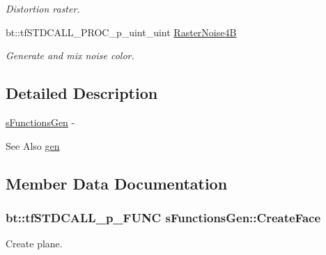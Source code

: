 \begin{DoxyCompactItemize}
\begin{DoxyCompactList}\small\item\em Distortion raster. \end{DoxyCompactList}\item 
\hypertarget{structs_functions_gen_a7611873c6067c5f5ad52719f551ecf9d}{bt\-::tf\-S\-T\-D\-C\-A\-L\-L\-\_\-\-P\-R\-O\-C\-\_\-p\-\_\-uint\-\_\-uint \hyperlink{structs_functions_gen_a7611873c6067c5f5ad52719f551ecf9d}{Raster\-Noise4\-B}}\label{structs_functions_gen_a7611873c6067c5f5ad52719f551ecf9d}

\begin{DoxyCompactList}\small\item\em Generate and mix noise color. \end{DoxyCompactList}\end{DoxyCompactItemize}


\subsection{Detailed Description}
\hyperlink{structs_functions_gen}{s\-Functions\-Gen} -\/ 

\begin{DoxySeeAlso}{See Also}
\hyperlink{namespacegen}{gen} 
\end{DoxySeeAlso}


\subsection{Member Data Documentation}
\hypertarget{structs_functions_gen_a1e8ed08e186afef7c5f7073cea51d189}{
\subsubsection[{Create\-Face}]{\setlength{\rightskip}{0pt plus 5cm}bt\-::tf\-S\-T\-D\-C\-A\-L\-L\-\_\-p\-\_\-\-F\-U\-N\-C s\-Functions\-Gen\-::\-Create\-Face}}\label{structs_functions_gen_a1e8ed08e186afef7c5f7073cea51d189}


Create plane. 

